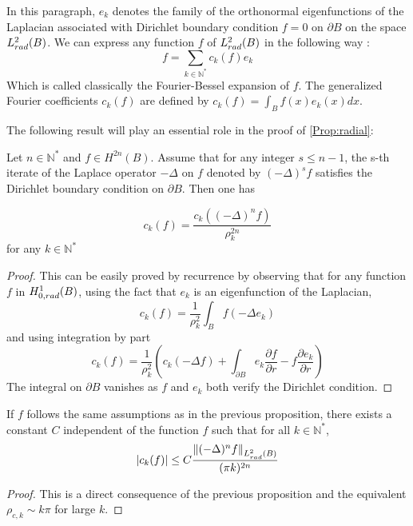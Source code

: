 \documentclass[11pt,a4paper]{article}
\begin{document}
In this paragraph, $e_{k}$ denotes the family of the orthonormal eigenfunctions of the Laplacian associated with Dirichlet boundary condition $f = 0$ on $\partial B$  on the space $L^2_{rad}(B)$. 
We can express any function $f$ of $L^2_{rad}(B)$ in the following way : 
\[f = \sum_{k\in \mathbb{N}^*}c_k(f)e_{k}\]
Which is called classically the Fourier-Bessel expansion of $f$. The generalized Fourier coefficients $c_k(f)$ are defined by $c_k(f) = \displaystyle \int_B f(x)e_{k}(x) dx$.

The following result will play an essential role in the proof of \ref{Prop:radial}:
\begin{Prop} Let $n\in \mathbb{N}^*$ and $f \in H^{2n}(B)$. Assume that for any integer $s\leq n-1$, the s-th iterate of the Laplace operator $-\Delta$ on $f$ denoted by $(-\Delta)^s f$ satisfies the Dirichlet boundary condition on $\partial B$. Then one has 

\[ c_k(f) = \dfrac{c_k\left(\left(-\Delta\right)^n f\right)}{\rho_{k}^{2n}}\] for any $k \in \mathbb{N}^*$
\begin{proof}
This can be easily proved by recurrence by observing that for any function $f$ in $H^1_{0,rad}(B)$, using the fact that $e_{k}$ is an eigenfunction of the Laplacian, \[c_k(f) = \frac{1}{\rho_{k}^2}\int_B f (-\Delta e_{k})\] and using integration by part \[c_k(f) = \frac{1}{\rho_{k}^2} \left(c_k(-\Delta f) + \int_{\partial B} e_k \dfrac{\partial f}{\partial r} - f \dfrac{\partial e_k}{\partial r}\right) \]
The integral on $\partial B$ vanishes as $f$ and $e_{k}$ both verify the Dirichlet condition.
\end{proof}
\label{PropDecrCond}
\end{Prop}

\begin{Cor} If $f$ follows the same assumptions as in the previous proposition, there exists a constant $C$ independent of the function $f$ such that for all $k \in \mathbb{N^*}$, 
\[ |c_k(f)| \leq  C \dfrac{\left\|(-\Delta)^n f\right\|_{L^2_{rad}(B)}}{(\pi k)^{2n}}\] 
\end{Cor}
\begin{proof}
This is a direct consequence of the previous proposition and the equivalent $\rho_{c,k} \sim k\pi$ for large $k$. 
\end{proof}
\end{document}
